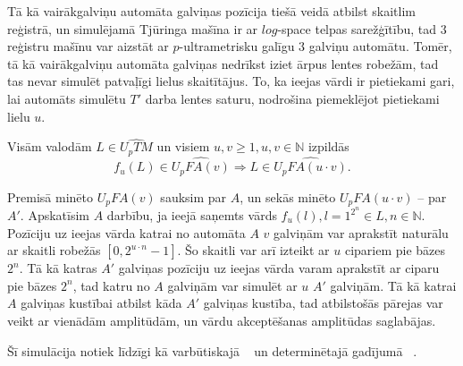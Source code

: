 \documentclass{ludis}
\begin{document}
\begin{pieradijums}
Tā kā vairākgalviņu automāta galviņas pozīcija tiešā veidā atbilst skaitlim reģistrā, un simulējamā Tjūringa mašīna ir ar $log$-space telpas sarežģītību, tad $3$ reģistru mašīnu var aizstāt ar $p$-ultrametrisku galīgu $3$ galviņu automātu. Tomēr, tā kā vairākgalviņu automāta galviņas nedrīkst iziet ārpus lentes robežām, tad tas nevar simulēt patvaļīgi lielus skaitītājus. To, ka ieejas vārdi ir pietiekami gari, lai automāts simulētu $T'$ darba lentes saturu, nodrošina piemeklējot pietiekami lielu $u$.
\end{pieradijums}

\begin{lemma} \label{reizinajums}
Visām valodām $L \in \widehat{U_pTM}$ un visiem $u, v \geq 1, u, v \in \mathbb{N}$ izpildās
\[
	f_u(L) \in \widehat{U_pFA(v)} \Rightarrow L \in \widehat{U_pFA(u \cdot v)}.
\]
\end{lemma}
\begin{pieradijums}
Premisā minēto $U_pFA(v)$ sauksim par $A$, un sekās minēto $U_pFA(u \cdot v)$ -- par $A'$.
Apskatīsim $A$ darbību, ja ieejā saņemts vārds $f_u(l), l = 1^{2^n} \in L, n \in \mathbb{N}$. Pozīciju uz ieejas vārda katrai no automāta $A$ $v$ galviņām var aprakstīt naturālu ar skaitli robežās $\left[0, 2^{u \cdot n} -1 \right]$. Šo skaitli var arī izteikt ar $u$ cipariem pie bāzes $2^n$. Tā kā katras $A'$ galviņas pozīciju uz ieejas vārda varam aprakstīt ar ciparu pie bāzes $2^n$, tad katru no $A$ galviņām var simulēt ar $u$ $A'$ galviņām. Tā kā katrai $A$ galviņas kustībai atbilst kāda $A'$ galviņas kustība, tad atbilstošās pārejas var veikt ar vienādām amplitūdām, un vārdu akceptēšanas amplitūdas saglabājas.

Šī simulācija notiek līdzīgi kā varbūtiskajā ~\citep{Macarie1995} un determinētajā gadījumā ~\citep{Monien1980}.
\end{pieradijums}
\end{document}
